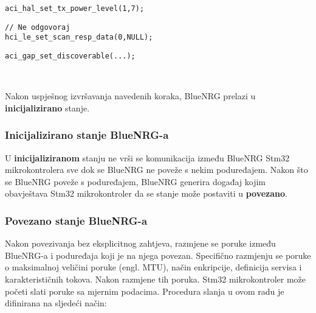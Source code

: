 \documentclass[times, utf8, diplomski]{diplomski}
\begin{document}
\begin{lstlisting}[caption={Postavi snagu odašiljača}]
aci_hal_set_tx_power_level(1,7);
\end{lstlisting}

\begin{lstlisting}[caption={Postavi odgovor na poruku otkrivanja (engl. discover message)}]
// Ne odgovoraj
hci_le_set_scan_resp_data(0,NULL);
\end{lstlisting}

\begin{lstlisting}[caption={Postavi stanje BlueNRGa u stanje u povezivo stanje}, label={lastinit}]
aci_gap_set_discoverable(...);
\end{lstlisting}
\ \

Nakon uspješnog izvršavanja navedenih koraka, BlueNRG prelazi u \textbf{inicijalizirano} stanje.

\subsubsection{Inicijalizirano stanje BlueNRG-a}
U \textbf{inicijaliziranom} stanju ne vrši se komunikacija između BlueNRG Stm32 mikrokontrolera sve dok se BlueNRG ne poveže s nekim poduređajem. Nakon što se BlueNRG poveže s poduređajem, BlueNRG generira događaj kojim obavještava Stm32 mikrokontroler da se stanje može postaviti u \textbf{povezano}.

\subsubsection{Povezano stanje BlueNRG-a}
Nakon povezivanja bez eksplicitnog zahtjeva, razmjene se poruke između BlueNRG-a i poduređaja koji je na njega povezan. Specifično razmjenju se poruke o maksimalnoj veličini poruke (engl. MTU), način enkripcije, definicija servisa i karakterističnih tokova. Nakon razmjene tih poruka. Stm32 mikrokontroler može početi slati poruke sa mjernim podacima. Procedura slanja u ovom radu je difinirana na sljedeći način:
\end{document}
